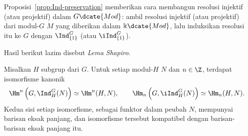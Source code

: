 Proposisi~\ref{prop:Ind-preservation} memberikan cara membangun resolusi
injektif (atau projektif) dalam $G\dcate{Mod}$: ambil resolusi injektif (atau
projektif) dari modul-$G$ $M$ yang diberikan dalam $\Bbbk\dcate{Mod}$, lalu
induksikan resolusi itu ke $G$ dengan $\Ind^G_{\{1\}}$ (atau
$\iInd^G_{\{1\}}$).

Hasil berikut lazim disebut \emph{Lema Shapiro}.

\begin{theorem}
\label{prop:Shapiro}
	Misalkan $H$ subgrup dari $G$. Untuk setiap modul-$H$ $N$ dan
	$n\in\Z$, terdapat isomorfisme kanonik
	\[ \Hm^n\left(G,\Ind^G_H(N)\right)\simeq\Hm^n(H,N),\qquad
	\Hm_n\left(G,\iInd^G_H(N)\right)\simeq\Hm_n(H,N). \]
	Kedua sisi setiap isomorfisme, sebagai funktor dalam peubah $N$,
	mempunyai barisan eksak panjang, dan isomorfisme tersebut kompatibel dengan
	barisan-barisan eksak panjang itu.
\end{theorem}
